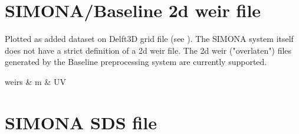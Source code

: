 \section{SIMONA/Baseline 2d weir file} \label{Sec:FileOVERLAAT}

Plotted as added dataset on Delft3D grid file (see ).
The SIMONA system itself does not have a strict definition of a 2d weir file.
The 2d weir ("overlaten") files generated by the Baseline preprocessing system are currently supported.

\begin{QUL-table}
\STRUT
weirs & m & UV
\end{QUL-table}




\section{SIMONA SDS file} \label{Sec:FileSDS}

